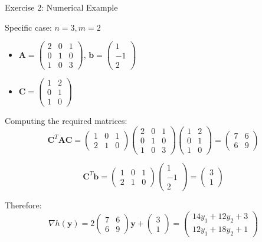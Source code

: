 \documentclass[aspectratio=1610]{beamer}
\begin{document}
\begin{frame}{Exercise 2: Numerical Example}
  \begin{block}{Specific case: $n=3, m=2$}
    \begin{itemize}
      \item $\mathbf{A} = \begin{pmatrix} 2 & 0 & 1 \\ 0 & 1 & 0 \\ 1 & 0 & 3 \end{pmatrix}$, $\mathbf{b} = \begin{pmatrix} 1 \\ -1 \\ 2 \end{pmatrix}$
      \item $\mathbf{C} = \begin{pmatrix} 1 & 2 \\ 0 & 1 \\ 1 & 0 \end{pmatrix}$
    \end{itemize}
    
    Computing the required matrices:
    $$\mathbf{C}^T\mathbf{A}\mathbf{C} = \begin{pmatrix} 1 & 0 & 1 \\ 2 & 1 & 0 \end{pmatrix}\begin{pmatrix} 2 & 0 & 1 \\ 0 & 1 & 0 \\ 1 & 0 & 3 \end{pmatrix}\begin{pmatrix} 1 & 2 \\ 0 & 1 \\ 1 & 0 \end{pmatrix} = \begin{pmatrix} 7 & 6 \\ 6 & 9 \end{pmatrix}$$
    
    $$\mathbf{C}^T\mathbf{b} = \begin{pmatrix} 1 & 0 & 1 \\ 2 & 1 & 0 \end{pmatrix}\begin{pmatrix} 1 \\ -1 \\ 2 \end{pmatrix} = \begin{pmatrix} 3 \\ 1 \end{pmatrix}$$
    
    Therefore:
    $$\nabla h(\mathbf{y}) = 2\begin{pmatrix} 7 & 6 \\ 6 & 9 \end{pmatrix}\mathbf{y} + \begin{pmatrix} 3 \\ 1 \end{pmatrix} = \begin{pmatrix} 14y_1 + 12y_2 + 3 \\ 12y_1 + 18y_2 + 1 \end{pmatrix}$$
  \end{block}
\end{frame}
\end{document}
